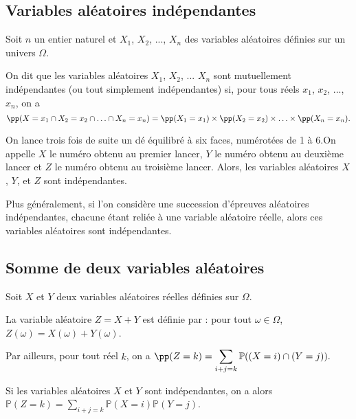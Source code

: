 \documentclass[11pt,fleqn, openany]{book} %
\begin{document}
\subsection{Variables aléatoires indépendantes}

\begin{definition}Soit $n$ un entier naturel et $X_1$, $X_2$, ..., $X_n$ des variables aléatoires définies sur un univers $\Omega$.

On dit que les variables aléatoires $X_1$, $X_2$, ... $X_n$ sont mutuellement indépendantes (ou tout simplement indépendantes) si, pour tous réels $x_1$, $x_2$, ..., $x_n$, on a
\[\pp(X=x_1 \cap X_2=x_2 \cap \ldots \cap X_n=x_n)=\pp(X_1=x_1) \times \pp(X_2=x_2) \times \ldots \times \pp(X_n=x_n).\]\end{definition}

\begin{example}On lance trois fois de suite un dé équilibré à six faces, numérotées de 1 à 6.On appelle $X$ le numéro obtenu au premier lancer, $Y$ le numéro obtenu au deuxième lancer et $Z$ le numéro obtenu au troisième lancer. Alors, les variables aléatoires $X$, $Y$, et $Z$ sont indépendantes.

Plus généralement, si l'on considère une succession d'épreuves aléatoires indépendantes, chacune étant reliée à une variable aléatoire réelle, alors ces variables aléatoires sont indépendantes.\end{example}



\subsection{Somme de deux variables aléatoires}


\begin{definition}Soit $X$ et $Y$ deux variables aléatoires réelles définies sur $\Omega$. 

La variable aléatoire $Z=X+Y$ est définie par : pour tout $\omega \in \Omega$,  $Z(\omega) =  X(\omega) + Y(\omega)$.

Par ailleurs, pour tout réel $k$, on a $\pp(Z=k) = \displaystyle \sum_{i+j=k} \mathbb{P}((X=i) \cap (Y=j)).$

Si les variables aléatoires $X$ et $Y$ sont indépendantes, on a alors $\mathbb{P}(Z=k)=\displaystyle\sum_{i+j=k} \mathbb{P}(X=i) \mathbb{P}(Y=j)$.\end{definition}
\end{document}
